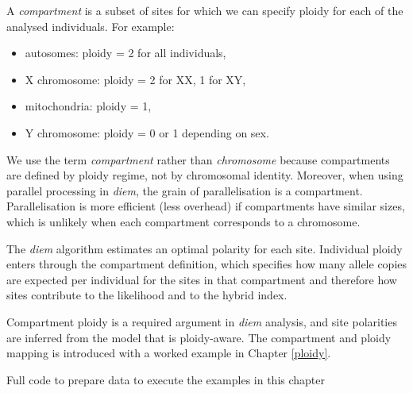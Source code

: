 \documentclass[
]{book}
\providecommand{\tightlist}{%
  \setlength{\itemsep}{0pt}\setlength{\parskip}{0pt}}
\begin{document}
A \emph{compartment} is a subset of sites for which we can specify ploidy for each of the analysed individuals. For example:

\begin{itemize}
\tightlist
\item
  autosomes: ploidy = 2 for all individuals,
\item
  X chromosome: ploidy = 2 for XX, 1 for XY,
\item
  mitochondria: ploidy = 1,
\item
  Y chromosome: ploidy = 0 or 1 depending on sex.
\end{itemize}

We use the term \emph{compartment} rather than \emph{chromosome} because compartments are defined by ploidy regime, not by chromosomal identity. Moreover, when using parallel processing in \emph{diem}, the grain of parallelisation is a compartment. Parallelisation is more efficient (less overhead) if compartments have similar sizes, which is unlikely when each compartment corresponds to a chromosome.

The \emph{diem} algorithm estimates an optimal polarity for each site. Individual ploidy enters through the compartment definition, which specifies how many allele copies are expected per individual for the sites in that compartment and therefore how sites contribute to the likelihood and to the hybrid index.

Compartment ploidy is a required argument in \emph{diem} analysis, and site polarities are inferred from the model that is ploidy-aware. The compartment and ploidy mapping is introduced with a worked example in Chapter \ref{ploidy}.

Full code to prepare data to execute the examples in this chapter
\end{document}
